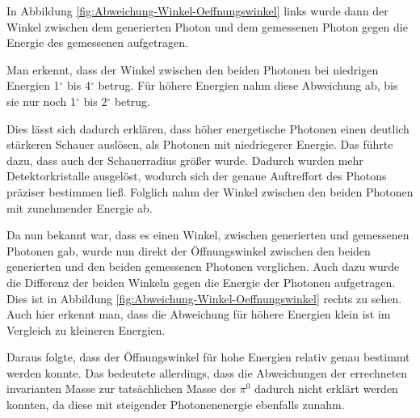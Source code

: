 \documentclass[a4paper,11pt,oneside,final,german,openbib,pdftex]{scrbook}
\begin{document}
{\begin{figure}[h!]
\end{figure}


In Abbildung \ref{fig:Abweichung-Winkel-Oeffnungswinkel} links wurde dann der Winkel zwischen dem generierten Photon und dem gemessenen Photon gegen die Energie des gemessenen aufgetragen.  

Man erkennt, dass der Winkel zwischen den beiden Photonen bei niedrigen Energien 1$^{\circ}$ bis 4$^{\circ}$ betrug. F\"ur h\"ohere Energien nahm diese Abweichung ab, bis sie nur noch 1$^{\circ}$ bis 2$^{\circ}$ betrug.

Dies l\"asst sich dadurch erkl\"aren, dass h\"oher energetische Photonen einen deutlich st\"arkeren Schauer ausl\"osen, als Photonen mit niedriegerer Energie. Das f\"uhrte dazu, dass auch der Schauerradius gr\"o{\ss}er wurde. Dadurch wurden mehr Detektorkristalle ausgel\"ost, wodurch sich der genaue Auftreffort des Photons pr\"aziser bestimmen lie{\ss}. Folglich nahm der Winkel zwischen den beiden Photonen mit zunehmender Energie ab.

Da nun bekannt war, dass es einen Winkel, zwischen generierten und gemessenen Photonen gab, wurde nun direkt der \"Offnungswinkel zwischen den beiden generierten und den beiden gemessenen Photonen verglichen. Auch dazu wurde die Differenz der beiden Winkeln gegen die Energie der Photonen aufgetragen. 
%		
%	
Dies ist in Abbildung \ref{fig:Abweichung-Winkel-Oeffnungswinkel} rechts zu sehen. Auch hier erkennt man, dass die Abweichung f\"ur h\"ohere Energien klein ist im Vergleich zu kleineren Energien. 

Daraus folgte, dass der \"Offnungswinkel f\"ur hohe Energien relativ genau bestimmt werden konnte. Das bedeutete allerdings, dass die Abweichungen der errechneten invarianten Masse zur tats\"achlichen Masse des $\pi^0$ dadurch nicht erkl\"art werden konnten, da diese mit steigender Photonenenergie ebenfalls zunahm. 




}
\end{document}
